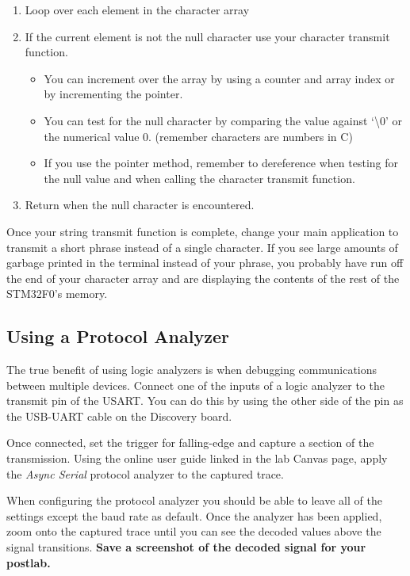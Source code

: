 \documentclass[openany,11pt,fleqn]{book} %
\begin{document}
\begin{enumerate}
 \item Loop over each element in the character array
 \item If the current element is not the null character use your character transmit function.
 \begin{itemize}
     \item You can increment over the array by using a counter and array index or by incrementing the pointer.
     \item You can test for the null character by comparing the value against `{\textbackslash}0' or the numerical value 0. (remember characters are numbers in C) 
     \item If you use the pointer method, remember to dereference when testing for the null value and when calling the character transmit function.
 \end{itemize} 
 \item Return when the null character is encountered. 
\end{enumerate}

Once your string transmit function is complete, change your main application to transmit a short phrase instead of a single character. If you see large amounts of garbage printed in the terminal instead of your phrase, you probably have run off the end of your character array and are displaying the contents of the rest of the STM32F0's memory. 

\subsection{Using a Protocol Analyzer}
The true benefit of using logic analyzers is when debugging communications between multiple devices. Connect one of the inputs of a logic analyzer to the transmit pin of the USART. You can do this by using the other side of the pin as the USB-UART cable on the Discovery board.

Once connected, set the trigger for falling-edge and capture a section of the transmission. Using the online user guide linked in the lab Canvas page, apply the \textit{Async Serial} protocol analyzer to the captured trace. 

When configuring the protocol analyzer you should be able to leave all of the settings except the baud rate as default. Once the analyzer has been applied, zoom onto the captured trace until you can see the decoded values above the signal transitions. \textbf{Save a screenshot of the decoded signal for your postlab. }
\end{document}
